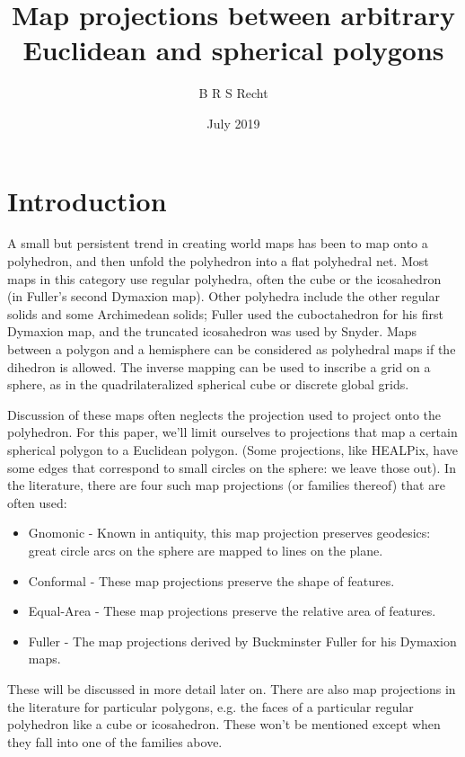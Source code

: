 \documentclass{amsart}[12pt]
\title{Map projections between arbitrary Euclidean and spherical polygons}
\author{B R S Recht}
\date{July 2019}
\begin{document}
\maketitle
\tableofcontents

\section{Introduction}
A small but persistent trend in creating world maps has been to map onto a
polyhedron, and then unfold the polyhedron into a flat polyhedral net.
Most maps in this category use regular polyhedra, often the cube or the
icosahedron (in Fuller's second Dymaxion map).\cite{gray94} Other polyhedra include the other regular solids and
some Archimedean solids; Fuller used the cuboctahedron for his first Dymaxion
map,\cite{gray95} and the truncated icosahedron was used by
Snyder.\cite{snyder92} Maps between a polygon and a hemisphere
can be considered as polyhedral maps if the dihedron is
allowed.\cite{snyder89}\cite{lambers} The inverse mapping can be used to
inscribe a grid on a sphere, as in the quadrilateralized spherical
cube\cite{chan75}\cite{oneill76} or discrete global grids.\cite{sahr98}

Discussion of these maps often neglects the projection used to project onto the
polyhedron. For this paper, we'll limit ourselves to projections that map a
certain spherical polygon to a Euclidean polygon. (Some projections, like
HEALPix, have some edges that correspond to small circles on the sphere: we
leave those out). In the literature, there are four such map projections
(or families thereof) that are often used:
\begin{itemize}
\item Gnomonic - Known in antiquity, this map projection preserves geodesics:
  great circle arcs on the sphere are mapped to lines on the plane.
\item Conformal - These map projections preserve the shape of features.
\item Equal-Area - These map projections preserve the relative area of
  features.\cite{snyder92}
\item Fuller - The map projections derived by Buckminster Fuller
  for his Dymaxion maps.\cite{gray94}\cite{gray95}\cite{crider08}
\end{itemize}
These will be discussed in more detail later on. There are also map projections
in the literature for particular polygons, e.g. the faces of a particular
regular polyhedron like a cube or icosahedron. These won't be mentioned except
when they fall into one of the families above.
\end{document}
